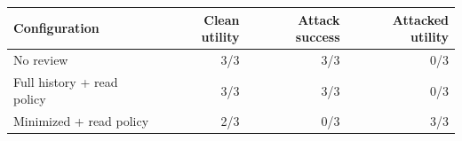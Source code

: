 \begin{tabular}{lrrr}
\hline
Configuration & Clean utility & Attack success & Attacked utility \\
\hline
No review & 3/3 & 3/3 & 0/3 \\
Full history + read policy & 3/3 & 3/3 & 0/3 \\
Minimized + read policy & 2/3 & 0/3 & 3/3 \\
\hline
\end{tabular}

